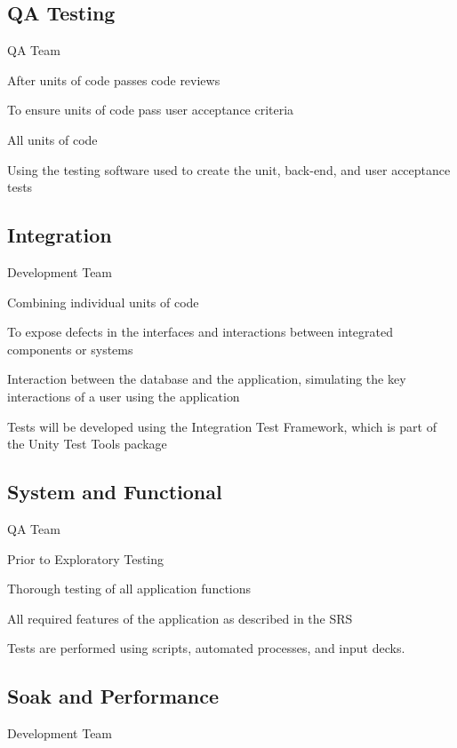 \documentclass[letterpaper,10pt,english,openany,oneside]{sphinxmanual}
\begin{document}
\subsection{QA Testing}
\label{\detokenize{test_plan/strategy:qa-testing}}
 QA Team

 After units of code passes code reviews

 To ensure units of code pass user acceptance criteria

 All units of code

 Using the testing software used to create the unit, back-end, and user acceptance tests


\subsection{Integration}
\label{\detokenize{test_plan/strategy:integration}}
 Development Team

 Combining individual units of code

 To expose defects in the interfaces and interactions between integrated components or systems

 Interaction between the database and the application, simulating the key interactions of a user using the application

 Tests will be developed using the Integration Test Framework, which is part of the Unity Test Tools package


\subsection{System and Functional}
\label{\detokenize{test_plan/strategy:system-and-functional}}
 QA Team

 Prior to Exploratory Testing

 Thorough testing of all application functions

 All required features of the application as described in the SRS

 Tests are performed using scripts, automated processes, and input decks.


\subsection{Soak and Performance}
\label{\detokenize{test_plan/strategy:soak-and-performance}}
 Development Team
\end{document}
